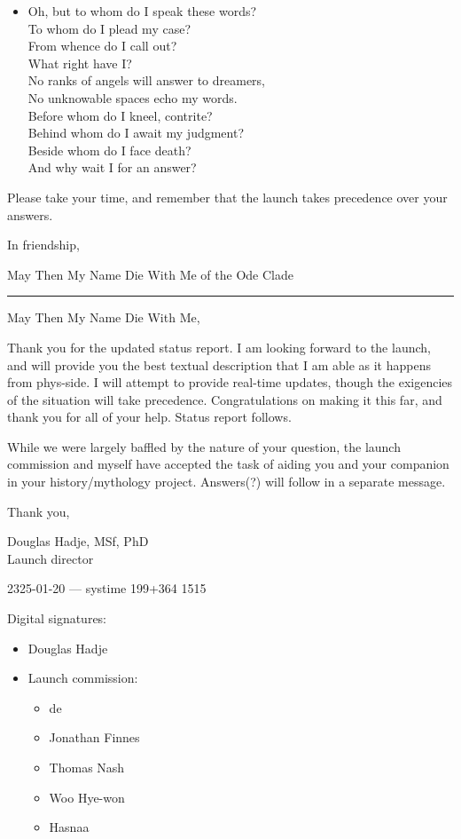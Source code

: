 \begin{itemize}
\item
  Oh, but to whom do I speak these words?\\
  To whom do I plead my case?\\
  From whence do I call out?\\
  What right have I?\\
  No ranks of angels will answer to dreamers,\\
  No unknowable spaces echo my words.\\
  Before whom do I kneel, contrite?\\
  Behind whom do I await my judgment?\\
  Beside whom do I face death?\\
  And why wait I for an answer?
\end{itemize}

Please take your time, and remember that the launch takes precedence over your answers.

In friendship,

May Then My Name Die With Me of the Ode Clade

\begin{center}\rule{0.5\linewidth}{0.5pt}\end{center}

May Then My Name Die With Me,

Thank you for the updated status report. I am looking forward to the launch, and will provide you the best textual description that I am able as it happens from phys-side. I will attempt to provide real-time updates, though the exigencies of the situation will take precedence. Congratulations on making it this far, and thank you for all of your help. Status report follows.

While we were largely baffled by the nature of your question, the launch commission and myself have accepted the task of aiding you and your companion in your history/mythology project. Answers(?) will follow in a separate message.

Thank you,

Douglas Hadje, MSf, PhD\\
Launch director

2325-01-20 — systime 199+364 1515

Digital signatures:

\begin{itemize}
\tightlist
\item
  Douglas Hadje
\item
  Launch commission:

  \begin{itemize}
  \tightlist
  \item
    de
  \item
    Jonathan Finnes
  \item
    Thomas Nash
  \item
    Woo Hye-won
  \item
    Hasnaa
  \end{itemize}
\end{itemize}

